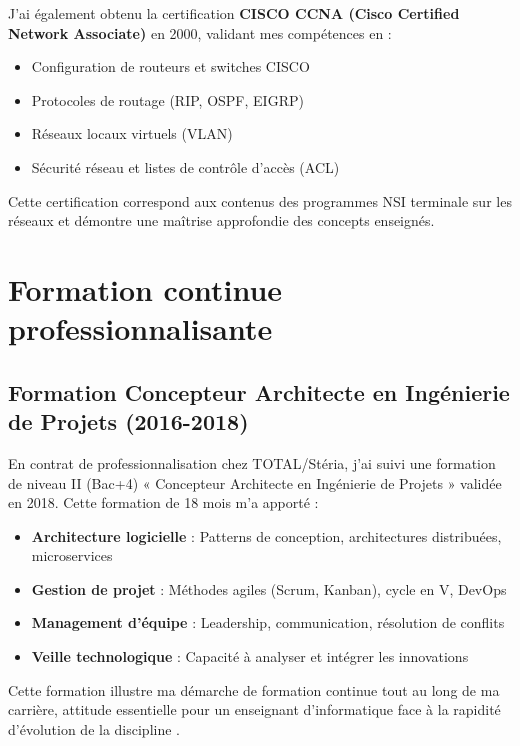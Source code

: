 J'ai également obtenu la certification \textbf{CISCO CCNA (Cisco Certified Network Associate)} en 2000, validant mes compétences en :

\begin{itemize}[leftmargin=*]
    \item Configuration de routeurs et switches CISCO
    \item Protocoles de routage (RIP, OSPF, EIGRP)
    \item Réseaux locaux virtuels (VLAN)
    \item Sécurité réseau et listes de contrôle d'accès (ACL)
\end{itemize}

Cette certification correspond aux contenus des programmes NSI terminale sur les réseaux \parencite{nsi_programmes} et démontre une maîtrise approfondie des concepts enseignés.

\section{Formation continue professionnalisante}

\subsection{Formation Concepteur Architecte en Ingénierie de Projets (2016-2018)}

En contrat de professionnalisation chez TOTAL/Stéria, j'ai suivi une formation de niveau II (Bac+4) « Concepteur Architecte en Ingénierie de Projets » validée en 2018. Cette formation de 18 mois m'a apporté :

\begin{itemize}[leftmargin=*]
    \item \textbf{Architecture logicielle} : Patterns de conception, architectures distribuées, microservices
    \item \textbf{Gestion de projet} : Méthodes agiles (Scrum, Kanban), cycle en V, DevOps
    \item \textbf{Management d'équipe} : Leadership, communication, résolution de conflits
    \item \textbf{Veille technologique} : Capacité à analyser et intégrer les innovations
\end{itemize}

Cette formation illustre ma démarche de formation continue tout au long de ma carrière, attitude essentielle pour un enseignant d'informatique face à la rapidité d'évolution de la discipline \parencite{referentiel_competences}.

